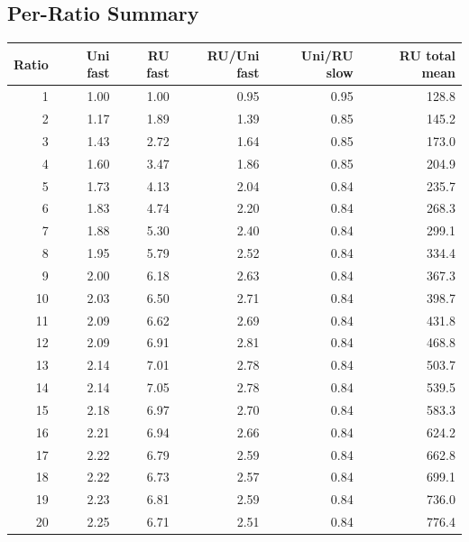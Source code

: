 \documentclass{article}
\begin{document}
\subsection*{Per-Ratio Summary}
\begin{longtable}{@{}rrrrrr@{}}
\toprule
Ratio & Uni fast & RU fast & RU/Uni fast & Uni/RU slow & RU total mean \\
\midrule
1 & 1.00 & 1.00 & 0.95 & 0.95 & 128.8 \\
2 & 1.17 & 1.89 & 1.39 & 0.85 & 145.2 \\
3 & 1.43 & 2.72 & 1.64 & 0.85 & 173.0 \\
4 & 1.60 & 3.47 & 1.86 & 0.85 & 204.9 \\
5 & 1.73 & 4.13 & 2.04 & 0.84 & 235.7 \\
6 & 1.83 & 4.74 & 2.20 & 0.84 & 268.3 \\
7 & 1.88 & 5.30 & 2.40 & 0.84 & 299.1 \\
8 & 1.95 & 5.79 & 2.52 & 0.84 & 334.4 \\
9 & 2.00 & 6.18 & 2.63 & 0.84 & 367.3 \\
10 & 2.03 & 6.50 & 2.71 & 0.84 & 398.7 \\
11 & 2.09 & 6.62 & 2.69 & 0.84 & 431.8 \\
12 & 2.09 & 6.91 & 2.81 & 0.84 & 468.8 \\
13 & 2.14 & 7.01 & 2.78 & 0.84 & 503.7 \\
14 & 2.14 & 7.05 & 2.78 & 0.84 & 539.5 \\
15 & 2.18 & 6.97 & 2.70 & 0.84 & 583.3 \\
16 & 2.21 & 6.94 & 2.66 & 0.84 & 624.2 \\
17 & 2.22 & 6.79 & 2.59 & 0.84 & 662.8 \\
18 & 2.22 & 6.73 & 2.57 & 0.84 & 699.1 \\
19 & 2.23 & 6.81 & 2.59 & 0.84 & 736.0 \\
20 & 2.25 & 6.71 & 2.51 & 0.84 & 776.4 \\
\bottomrule
\end{longtable}
\end{document}
